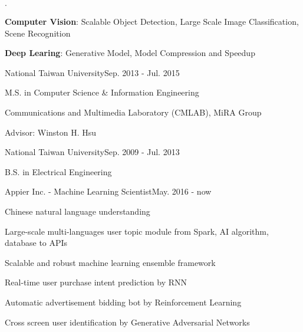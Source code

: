 \documentclass{joel_cv}
\begin{document}
\begin{cvHeader} 
\end{cvHeader}

%
%

\begin{sectionItemize}{$\cdot$}
	\item \textbf{Computer Vision}: 
	Scalable Object Detection, Large Scale Image Classification, Scene Recognition
	\item \textbf{Deep Learing}:
	Generative Model, Model Compression and Speedup
\end{sectionItemize}

%
%

\begin{sectionContentSimple}{National Taiwan University}{Sep. 2013 - Jul. 2015}
	\item M.S. in Computer Science \& Information Engineering
	\item Communications and Multimedia Laboratory (CMLAB), MiRA Group
	\item Advisor: Winston H. Hsu
\end{sectionContentSimple}

\begin{sectionContentSimple}{National Taiwan University}{Sep. 2009 - Jul. 2013}
	\item B.S. in Electrical Engineering
\end{sectionContentSimple}

%
%

\begin{profExp}{Appier Inc. - Machine Learning Scientist}{May. 2016 - now}
	\item Chinese natural language understanding
	\item Large-scale multi-languages user topic module from Spark, AI algorithm, database to APIs
	\item Scalable and robust machine learning ensemble framework
	\item Real-time user purchase intent prediction by RNN
	\item Automatic advertisement bidding bot by Reinforcement Learning
	\item Cross screen user identification by Generative Adversarial Networks
\end{profExp}
\end{document}
